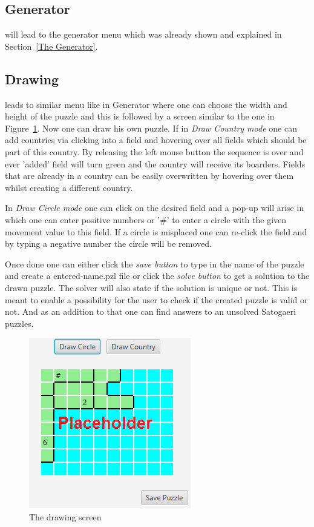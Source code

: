 \subsection{Generator} will lead to the generator menu which was already shown and explained in Section~\ref{The Generator}.

\subsection{Drawing} leads to similar menu like in Generator where one can choose the width and height of the puzzle and this is followed by a screen similar to the one in Figure~\ref{fig:drawing_screen}.
Now one can draw his own puzzle. If in \emph{Draw Country mode} one can add countries via clicking into a field and hovering over all fields which should be part of this country. By releasing the left mouse button the sequence is over and ever 'added' field will turn green and the country will receive its boarders. Fields that are already in a country can be easily overwritten by hovering over them whilst creating a different country.

In \emph{Draw Circle mode} one can click on the desired field and a pop-up will arise in which one can enter positive numbers or '\#' to enter a circle with the given movement value to this field. If a circle is misplaced one can re-click the field and by typing a negative number the circle will be removed.

Once done one can either click the \emph{save button} to type in the name of the puzzle and create a entered-name.pzl file or click the \emph{solve button} to get a solution to the drawn puzzle. The solver will also state if the solution is unique or not. This is meant to enable a possibility for the user to check if the created puzzle is valid or not. And as an addition to that one can find answers to an unsolved Satogaeri puzzles.
\begin{figure}
  \centering
  \includegraphics[scale=1]{Pictures/drawing_screen.png} 
  \caption{The drawing screen}
  \label{fig:drawing_screen}
\end{figure}

